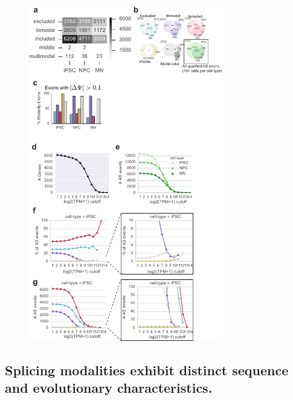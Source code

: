 \begin{figure}[h]
\ContinuedFloat
\captionsetup{labelformat=empty}
\centering
\includegraphics[height=5.8in]{figures/anchor_supplementary.pdf}
\end{figure}
\addtocounter{figure}{1}
\clearpage


\subsection{Splicing modalities exhibit distinct sequence and evolutionary characteristics.}



